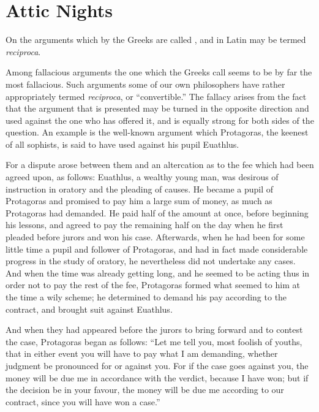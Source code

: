 
\author{Aulus Gellius}
\chapter[Attic Nights, bk. 5.10]{Attic Nights}

\begin{center}{\small On the arguments which by the Greeks
are called , and in Latin may be termed
\textit{reciproca}.}\end{center}

\noindent Among fallacious arguments the one which the Greeks call
 seems to be by far the most fallacious. Such
arguments some of our own philosophers have rather appropriately
termed \textit{reciproca}, or ``convertible.'' The fallacy arises from
the fact that the argument that is presented may be turned in the
opposite direction and used against the one who has offered it, and is
equally strong for both sides of the question. An example is the
well-known argument which Protagoras, the keenest of all sophists, is
said to have used against his pupil Euathlus.

For a dispute arose between them and an altercation as to
the fee which had been agreed upon, as follows: Euathlus, a wealthy
young man, was desirous of instruction in oratory and the pleading of
causes. He became a pupil of Protagoras and promised to pay him a
large sum of money, as much as Protagoras had demanded. He paid half
of the amount at once, before beginning his lessons, and agreed to pay
the remaining half on the day when he first pleaded before jurors and
won his case. Afterwards, when he had been for some little time a
pupil and follower of Protagoras, and had in fact made considerable
progress in the study of oratory, he nevertheless did not undertake
any cases. And when the time was already getting long, and he seemed
to be acting thus in order not to pay the rest of the fee, Protagoras
formed what seemed to him at the time a wily scheme; he determined to
demand his pay according to the contract, and brought suit against
Euathlus.

And when they had appeared before the jurors to bring forward and to
contest the case, Protagoras began as follows: ``Let me tell you, most
foolish of youths, that in either event you will have to pay what I am
demanding, whether judgment be pronounced for or against you. For if
the case goes against you, the money will be due me in accordance with
the verdict, because I have won; but if the decision be in your
favour, the money will be due me according to our contract, since you
will have won a case.''


